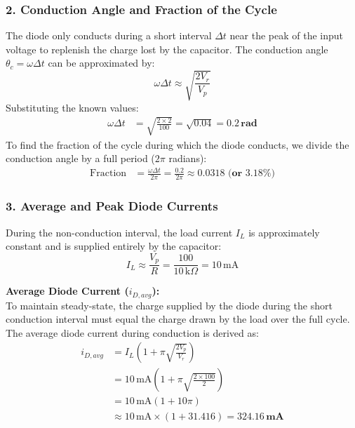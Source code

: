 \documentclass[12pt,a3paper]{article}
\begin{document}
\begin{enumerate}
\begin{tcolorbox}[enhanced,breakable,ansbox,colback=cA!4,colframe=cA,boxrule=0.8pt,arc=5pt,title={\textbf{Answer}},fonttitle=\bfseries\color{white},colbacktitle=cA]
\subsubsection*{2. Conduction Angle and Fraction of the Cycle}
The diode only conducts during a short interval $\Delta t$ near the peak of the input voltage to replenish the charge lost by the capacitor. The conduction angle $\theta_c = \omega \Delta t$ can be approximated by:
\begin{equation*}
    \omega \Delta t \approx \sqrt{\frac{2V_r}{V_p}}
\end{equation*}
Substituting the known values:
\begin{align*}
    \omega \Delta t &= \sqrt{\frac{2 \times 2}{100}} = \sqrt{0.04} = \mathbf{0.2\,\text{rad}}
\end{align*}
To find the fraction of the cycle during which the diode conducts, we divide the conduction angle by a full period ($2\pi$ radians):
\begin{align*}
    \text{Fraction} &= \frac{\omega \Delta t}{2\pi} = \frac{0.2}{2\pi} \approx \mathbf{0.0318 \text{ (or } 3.18\%)}
\end{align*}

\subsubsection*{3. Average and Peak Diode Currents}
During the non-conduction interval, the load current $I_L$ is approximately constant and is supplied entirely by the capacitor:
\begin{equation*}
    I_L \approx \frac{V_p}{R} = \frac{100}{10\,\text{k}\Omega} = 10\,\text{mA}
\end{equation*}

\textbf{Average Diode Current ($i_{D,avg}$):} \\
To maintain steady-state, the charge supplied by the diode during the short conduction interval must equal the charge drawn by the load over the full cycle. The average diode current during conduction is derived as:
\begin{align*}
    i_{D,avg} &= I_L \left( 1 + \pi \sqrt{\frac{2V_p}{V_r}} \right) \\
    &= 10\,\text{mA} \left( 1 + \pi \sqrt{\frac{2 \times 100}{2}} \right) \\
    &= 10\,\text{mA} \left( 1 + 10\pi \right) \\
    &\approx 10\,\text{mA} \times (1 + 31.416) = \mathbf{324.16\,\text{mA}}
\end{align*}


\end{tcolorbox}
\end{enumerate}
\end{document}
